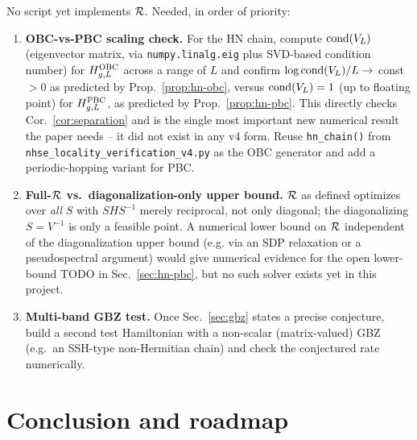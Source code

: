\begin{todo}
No script yet implements $\mathcal R$. Needed, in order of priority:
\begin{enumerate}
\item \textbf{OBC-vs-PBC scaling check.} For the HN chain, compute
  $\operatorname{cond}(V_L)$ (eigenvector matrix, via \texttt{numpy.linalg.eig}
  plus SVD-based condition number) for $H_{g,L}^{\rm OBC}$ across a
  range of $L$ and confirm $\log\operatorname{cond}(V_L)/L\to$ const $>0$ as
  predicted by Prop.~\ref{prop:hn-obc}, versus
  $\operatorname{cond}(V_L)=1$ (up to floating point) for $H_{g,L}^{\rm PBC}$, as
  predicted by Prop.~\ref{prop:hn-pbc}. This directly checks
  Cor.~\ref{cor:separation} and is the single most important new
  numerical result the paper needs -- it did not exist in any v4
  form. Reuse \texttt{hn\_chain()} from
  \texttt{nhse\_locality\_verification\_v4.py} as the OBC generator
  and add a periodic-hopping variant for PBC.
\item \textbf{Full-$\mathcal R$ vs.\ diagonalization-only upper bound.}
  $\mathcal R$ as defined optimizes over \emph{all} $S$ with
  $SHS^{-1}$ merely reciprocal, not only diagonal; the diagonalizing
  $S=V^{-1}$ is only a feasible point. A numerical lower bound on
  $\mathcal R$ independent of the diagonalization upper bound (e.g. via
  an SDP relaxation or a pseudospectral argument) would give
  numerical evidence for the open lower-bound TODO in
  Sec.~\ref{sec:hn-pbc}, but no such solver exists yet in this
  project.
\item \textbf{Multi-band GBZ test.} Once Sec.~\ref{sec:gbz} states a
  precise conjecture, build a second test Hamiltonian with a
  non-scalar (matrix-valued) GBZ (e.g.\ an SSH-type non-Hermitian
  chain) and check the conjectured rate numerically.
\end{enumerate}
\end{todo}

\section{Conclusion and roadmap}
\label{sec:conclusion}

